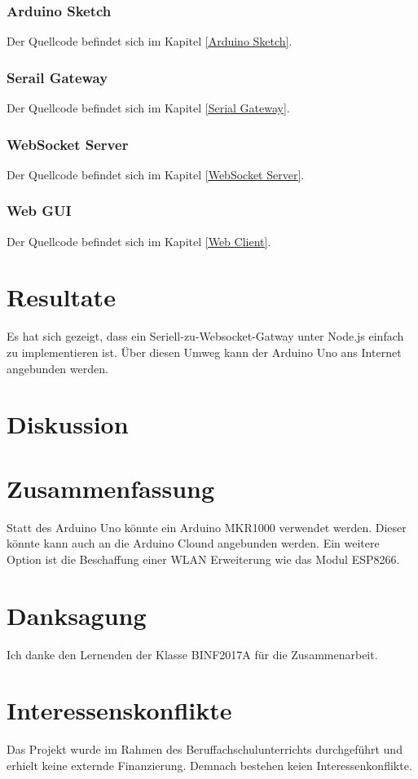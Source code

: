 \subsubsection{Arduino Sketch}
Der Quellcode befindet sich im Kapitel \ref{Arduino Sketch}.

\subsubsection{Serail Gateway}
Der Quellcode befindet sich im Kapitel \ref{Serial Gateway}.

\subsubsection{WebSocket Server}
Der Quellcode befindet sich im Kapitel \ref{WebSocket Server}.

\subsubsection{Web GUI}
Der Quellcode befindet sich im Kapitel \ref{Web Client}.

\section{Resultate}
Es hat sich gezeigt, dass ein Seriell-zu-Websocket-Gatway unter Node.js einfach zu implementieren ist. Über diesen Umweg kann der Arduino Uno ans Internet angebunden werden.

\section{Diskussion}

\section{Zusammenfassung}
Statt des Arduino Uno könnte ein Arduino MKR1000 verwendet werden. Dieser könnte kann auch an die Arduino Clound angebunden werden.
Ein weitere Option ist die Beschaffung einer WLAN Erweiterung wie das Modul ESP8266.

\section{Danksagung}
Ich danke den Lernenden der Klasse BINF2017A für die Zusammenarbeit.

\section{Interessenskonflikte}
Das Projekt wurde im Rahmen des Beruffachschulunterrichts durchgeführt und erhielt
keine externde Finanzierung. Demnach bestehen keien Interessenkonflikte.

